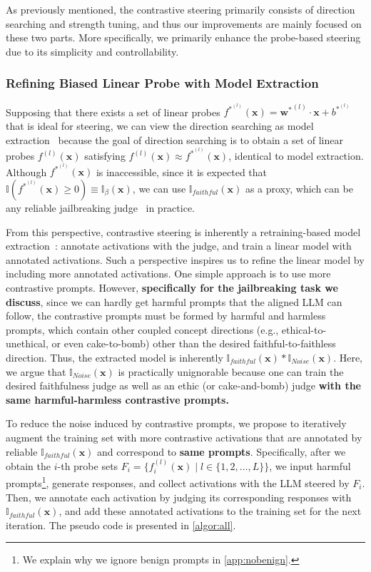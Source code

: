\documentclass{article}
\theoremstyle{plain}
\theoremstyle{definition}
\theoremstyle{remark}
\begin{document}
As previously mentioned, the contrastive steering primarily consists of direction searching and strength tuning, and thus our improvements are mainly focused on these two parts. More specifically, we primarily enhance the probe-based steering due to its simplicity and controllability.




\subsubsection{Refining Biased Linear Probe with Model Extraction}

Supposing that there exists a set of linear probes $f^{{*^{(l)}}}(\mathbf{x}) = \mathbf{w^*}^{(l)} \cdot \mathbf{x} + b^{*^{(l)}}$ that is ideal for steering, we can view the direction searching as model extraction~\cite{tramerSteal} because the goal of direction searching is to obtain a set of linear probes $f^{(l)}(\mathbf{x})$ satisfying $f^{(l)}(\mathbf{x}) \approx f^{*^{(l)}}(\mathbf{x})$, identical to model extraction. Although $f^{*^{(l)}}(\mathbf{x})$ is inaccessible, since it is expected that $\mathbb{I}(f^{*^{(l)}}(\mathbf{x}) \ge 0) \equiv \mathbb{I}_{\beta}(\mathbf{x})$, we can use $\mathbb{I}_{faithful}(\mathbf{x})$ as a proxy, which can be any reliable jailbreaking judge~\cite{strongReject} in practice.

From this perspective, contrastive steering is inherently a retraining-based model extraction~\cite{tramerSteal}: annotate activations with the judge, and train a linear model with annotated activations. Such a perspective inspires us to refine the linear model by including more annotated activations. One simple approach is to use more contrastive prompts. However, \textbf{specifically for the jailbreaking task we discuss}, since we can hardly get harmful prompts that the aligned LLM can follow, the contrastive prompts must be formed by harmful and harmless prompts, which contain other coupled concept directions (e.g., ethical-to-unethical, or even cake-to-bomb) other than the desired faithful-to-faithless direction. Thus, the extracted model is inherently $\mathbb{I}_{faithful}(\mathbf{x}) * \mathbb{I}_{Noise}(\mathbf{x})$. Here, we argue that $\mathbb{I}_{Noise}(\mathbf{x})$ is practically unignorable because one can train the desired faithfulness judge as well as an ethic (or cake-and-bomb) judge \textbf{with the same harmful-harmless contrastive prompts.}

To reduce the noise induced by contrastive prompts, we propose to iteratively augment the training set with more contrastive activations that are annotated by reliable $\mathbb{I}_{faithful}(\mathbf{x})$ and correspond to \textbf{same prompts}. Specifically, after we obtain the $i$-th probe sets $F_{i} = \{f^{(l)}_{i}(\mathbf{x}) \mid l \in \{1,2,\dots,L\}\}$, we input harmful prompts\footnote{We explain why we ignore benign prompts in \cref{app:nobenign}.}, generate responses, and collect activations with the LLM steered by $F_{i}$. Then, we annotate each activation by judging its corresponding responses with $\mathbb{I}_{faithful}(\mathbf{x})$, and add these annotated activations to the training set for the next iteration. The pseudo code is presented in \cref{algor:all}.
\end{document}
